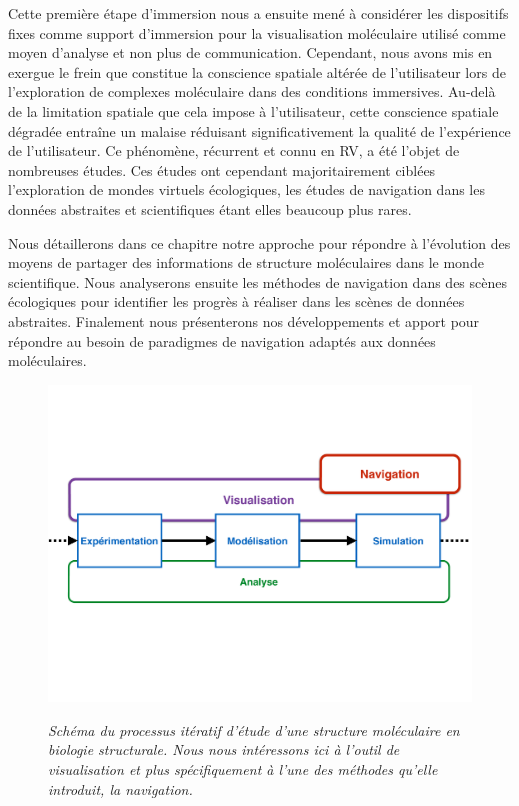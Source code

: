 Cette première étape d'immersion nous a ensuite mené à considérer les dispositifs fixes comme support d'immersion pour la visualisation moléculaire utilisé comme moyen d'analyse et non plus de communication. 
Cependant, nous avons mis en exergue le frein que constitue la conscience spatiale altérée de l'utilisateur lors de l'exploration de complexes moléculaire dans des conditions immersives. Au-delà de la limitation spatiale que cela impose à l'utilisateur, cette conscience spatiale dégradée entraîne un malaise réduisant significativement la qualité de l'expérience de l'utilisateur.
Ce phénomène, récurrent et connu en RV, a été l'objet de nombreuses études. Ces études ont cependant majoritairement ciblées l'exploration de mondes virtuels écologiques, les études de navigation dans les données abstraites et scientifiques étant elles beaucoup plus rares. 

Nous détaillerons dans ce chapitre notre approche pour répondre à l'évolution des moyens de partager des informations de structure moléculaires dans le monde scientifique. Nous analyserons ensuite les méthodes de navigation dans des scènes écologiques pour identifier les progrès à réaliser dans les scènes de données abstraites. Finalement nous présenterons nos développements et apport pour répondre au besoin de paradigmes de navigation adaptés aux données moléculaires.

\begin{figure}
  \centering
  {\includegraphics[width=1.0\linewidth]{./figures/ch3/process_bio_struct_navigation}}
    \caption[Schéma du processus itératif d'étude d'une structure moléculaire en biologie structurale.]{\it Schéma du processus itératif d'étude d'une structure moléculaire en biologie structurale. Nous nous intéressons ici à l'outil de visualisation et plus spécifiquement à l'une des méthodes qu'elle introduit, la navigation.}
  \label{Fig:process_bio_struct_navigation}
  \hspace{0.3cm}
\end{figure}

